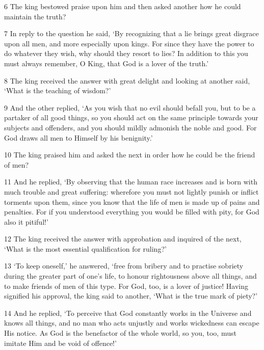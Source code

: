 \par 6 The king bestowed praise upon him and then asked another how he could maintain the truth?

\par 7 In reply to the question he said, ‘By recognizing that a lie brings great disgrace upon all men, and more especially upon kings. For since they have the power to do whatever they wish, why should they resort to lies? In addition to this you must always remember, O King, that God is a lover of the truth.’

\par 8 The king received the answer with great delight and looking at another said, ‘What is the teaching of wisdom?’

\par 9 And the other replied, ‘As you wish that no evil should befall you, but to be a partaker of all good things, so you should act on the same principle towards your subjects and offenders, and you should mildly admonish the noble and good. For God draws all men to Himself by his benignity.’

\par 10 The king praised him and asked the next in order how he could be the friend of men?

\par 11 And he replied, ‘By observing that the human race increases and is born with much trouble and great suffering: wherefore you must not lightly punish or inflict torments upon them, since you know that the life of men is made up of pains and penalties. For if you understood everything you would be filled with pity, for God also it pitiful!’

\par 12 The king received the answer with approbation and inquired of the next, ‘What is the most essential qualification for ruling?’

\par 13 ‘To keep oneself,’ he answered, ‘free from bribery and to practise sobriety during the greater part of one’s life, to honour rightousness above all things, and to make friends of men of this type. For God, too, is a lover of justice! Having signified his approval, the king said to another, ‘What is the true mark of piety?’

\par 14 And he replied, ‘To perceive that God constantly works in the Universe and knows all things, and no man who acts unjustly and works wickedness can escape His notice. As God is the benefactor of the whole world, so you, too, must imitate Him and be void of offence!’

